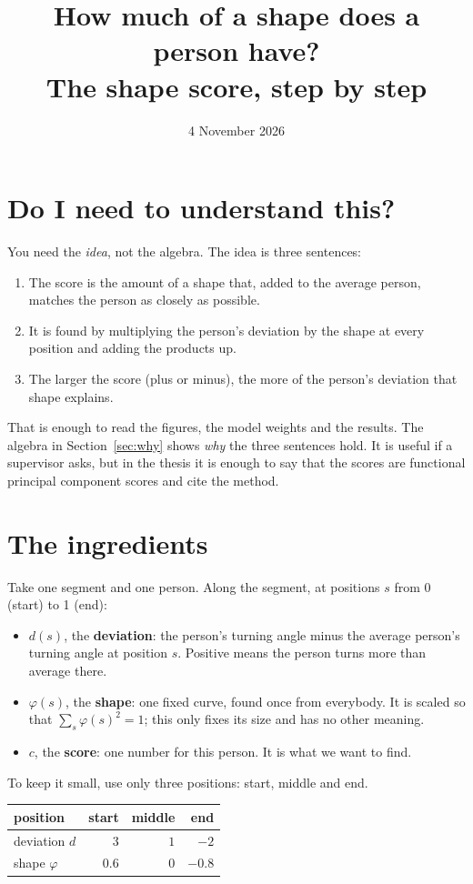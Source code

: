 \documentclass[11pt,a4paper]{article}
\title{How much of a shape does a person have?\\[0.3em]\large The shape score, step by step}
\date{4 November 2026}
\begin{document}
\maketitle

\section*{Do I need to understand this?}
You need the \emph{idea}, not the algebra. The idea is three sentences:
\begin{enumerate}
  \item The score is the amount of a shape that, added to the average person, matches the person
        as closely as possible.
  \item It is found by multiplying the person's deviation by the shape at every position and adding
        the products up.
  \item The larger the score (plus or minus), the more of the person's deviation that shape explains.
\end{enumerate}
That is enough to read the figures, the model weights and the results. The algebra in
Section~\ref{sec:why} shows \emph{why} the three sentences hold. It is useful if a supervisor asks,
but in the thesis it is enough to say that the scores are functional principal component scores and
cite the method.

\section{The ingredients}
Take one segment and one person. Along the segment, at positions $s$ from 0 (start) to 1 (end):
\begin{itemize}
  \item $d(s)$, the \textbf{deviation}: the person's turning angle minus the average person's
        turning angle at position $s$. Positive means the person turns more than average there.
  \item $\varphi(s)$, the \textbf{shape}: one fixed curve, found once from everybody. It is scaled so
        that $\sum_s \varphi(s)^2 = 1$; this only fixes its size and has no other meaning.
  \item $c$, the \textbf{score}: one number for this person. It is what we want to find.
\end{itemize}

To keep it small, use only three positions: start, middle and end.

\begin{center}
\begin{tabular}{lrrr}
  \toprule
  position & start & middle & end \\
  \midrule
  deviation $d$ & $3$ & $1$ & $-2$ \\
  shape $\varphi$ & $0.6$ & $0$ & $-0.8$ \\
  \bottomrule
\end{tabular}
\end{center}
\end{document}
